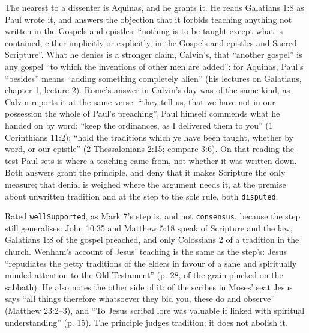 \documentclass[11pt]{article}
\begin{document}
The nearest to a dissenter is Aquinas, and he grants it. He reads Galatians 1:8 as Paul wrote it, and answers the objection that it forbids teaching anything not written in the Gospels and epistles: “nothing is to be taught except what is contained, either implicitly or explicitly, in the Gospels and epistles and Sacred Scripture”. What he denies is a stronger claim, Calvin’s, that “another gospel” is any gospel “to which the inventions of other men are added”: for Aquinas, Paul’s “besides” means “adding something completely alien” (his lectures on Galatians, chapter 1, lecture 2). Rome’s answer in Calvin’s day was of the same kind, as Calvin reports it at the same verse: “they tell us, that we have not in our possession the whole of Paul’s preaching”. Paul himself commends what he handed on by word: “keep the ordinances, as I delivered them to you” (1 Corinthians 11:2); “hold the traditions which ye have been taught, whether by word, or our epistle” (2 Thessalonians 2:15; compare 3:6). On that reading the test Paul sets is where a teaching came from, not whether it was written down. Both answers grant the principle, and deny that it makes Scripture the only measure; that denial is weighed where the argument needs it, at the premise about unwritten tradition and at the step to the sole rule, both \texttt{disputed}.

Rated \texttt{well\allowbreak{}Supported}, as Mark 7’s step is, and not \texttt{consensus}, because the step still generalises: John 10:35 and Matthew 5:18 speak of Scripture and the law, Galatians 1:8 of the gospel preached, and only Colossians 2 of a tradition in the church. Wenham’s account of Jesus’ teaching is the same as the step’s: Jesus “repudiates the petty traditions of the elders in favour of a sane and spiritually minded attention to the Old Testament” (p. 28, of the grain plucked on the sabbath). He also notes the other side of it: of the scribes in Moses’ seat Jesus says “all things therefore whatsoever they bid you, these do and observe” (Matthew 23:2–3), and “To Jesus scribal lore was valuable if linked with spiritual understanding” (p. 15). The principle judges tradition; it does not abolish it.
\end{document}
